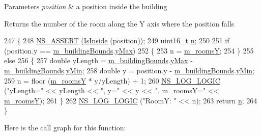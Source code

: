 \begin{DoxyParams}{Parameters}
{\em position} & a position inside the building\\
\hline
\end{DoxyParams}
\begin{DoxyReturn}{Returns}
the number of the room along the Y axis where the position falls 
\end{DoxyReturn}

\begin{DoxyCode}
247 \{
248   \hyperlink{assert_8h_a6dccdb0de9b252f60088ce281c49d052}{NS\_ASSERT} (\hyperlink{classns3_1_1Building_aa6fc519b99648c37c829fe52fa91eb8f}{IsInside} (position));
249   uint16\_t \hyperlink{namespacesample-rng-plot_aeb5ee5c431e338ef39b7ac5431242e1d}{n};
250 
251   \textcolor{keywordflow}{if} (position.y ==  \hyperlink{classns3_1_1Building_aec4c01efb67198b28de7a51b69a8d857}{m\_buildingBounds}.\hyperlink{classns3_1_1Box_a001fd430a14b19efe925c818a332e392}{yMax})
252     \{
253       n = \hyperlink{classns3_1_1Building_ac754f0013fd5d8dd69de871ada562f2a}{m\_roomsY};
254     \}                                                                   
255   \textcolor{keywordflow}{else}
256     \{
257       \textcolor{keywordtype}{double} yLength = \hyperlink{classns3_1_1Building_aec4c01efb67198b28de7a51b69a8d857}{m\_buildingBounds}.\hyperlink{classns3_1_1Box_a001fd430a14b19efe925c818a332e392}{yMax} - 
      \hyperlink{classns3_1_1Building_aec4c01efb67198b28de7a51b69a8d857}{m\_buildingBounds}.\hyperlink{classns3_1_1Box_a3865ed092f941186823539c9979002f8}{yMin};
258       \textcolor{keywordtype}{double} y = position.y - \hyperlink{classns3_1_1Building_aec4c01efb67198b28de7a51b69a8d857}{m\_buildingBounds}.\hyperlink{classns3_1_1Box_a3865ed092f941186823539c9979002f8}{yMin};
259       n = floor (\hyperlink{classns3_1_1Building_ac754f0013fd5d8dd69de871ada562f2a}{m\_roomsY} * y/yLength) + 1;
260       \hyperlink{group__logging_ga88acd260151caf2db9c0fc84997f45ce}{NS\_LOG\_LOGIC} (\textcolor{stringliteral}{"yLength="} << yLength << \textcolor{stringliteral}{", y="} << y << \textcolor{stringliteral}{", m\_roomsY="} << 
      \hyperlink{classns3_1_1Building_ac754f0013fd5d8dd69de871ada562f2a}{m\_roomsY});
261     \}
262   \hyperlink{group__logging_ga88acd260151caf2db9c0fc84997f45ce}{NS\_LOG\_LOGIC} (\textcolor{stringliteral}{"RoomY: "} << n);
263   \textcolor{keywordflow}{return} \hyperlink{namespacesample-rng-plot_aeb5ee5c431e338ef39b7ac5431242e1d}{n};
264 \}
\end{DoxyCode}


Here is the call graph for this function\+:


